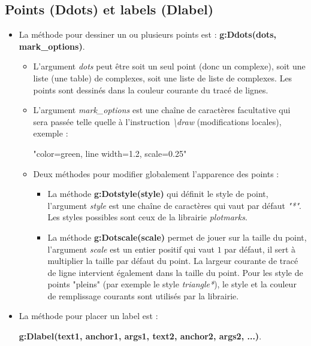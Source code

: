 \subsection{Points (Ddots) et labels (Dlabel)}

\begin{itemize}
\item La méthode pour dessiner un ou plusieurs points est : \textbf{g:Ddots(dots, mark\_options)}.

    \begin{itemize}
    \item L'argument \emph{dots} peut être soit un seul point (donc un complexe), soit une liste (une table) de complexes, soit une liste  de liste de complexes. Les points sont dessinés dans la couleur courante du tracé de lignes.
    \item L'argument \emph{mark\_options} est une chaîne de caractères facultative qui sera passée telle quelle à l'instruction \emph{\textbackslash draw} (modifications locales), exemple :
\begin{TeXcode}
    "color=green, line width=1.2, scale=0.25"
\end{TeXcode}

    \item  Deux méthodes pour modifier globalement l'apparence des points :
        \begin{itemize}
        \item La méthode \textbf{g:Dotstyle(style)} qui définit le style de point, l'argument \emph{style} est une chaîne de caractères qui vaut par défaut \emph{"*"}. Les styles possibles sont ceux de la librairie \emph{plotmarks}.
        \item La méthode \textbf{g:Dotscale(scale)} permet de jouer sur la taille du point, l'argument \emph{scale} est un entier positif qui vaut $1$ par défaut, il sert à multiplier la taille par défaut du point. La largeur courante de tracé de ligne intervient également dans la taille du point. Pour les style de points "pleins" (par exemple le style \emph{triangle*}), le style et la couleur de remplissage courants sont utilisés par la librairie.
        \end{itemize}
    \end{itemize}
    
\item La méthode pour placer un label est : 

\hfil\textbf{g:Dlabel(text1, anchor1, args1, text2, anchor2, args2, ...)}.\hfil


\end{itemize}
